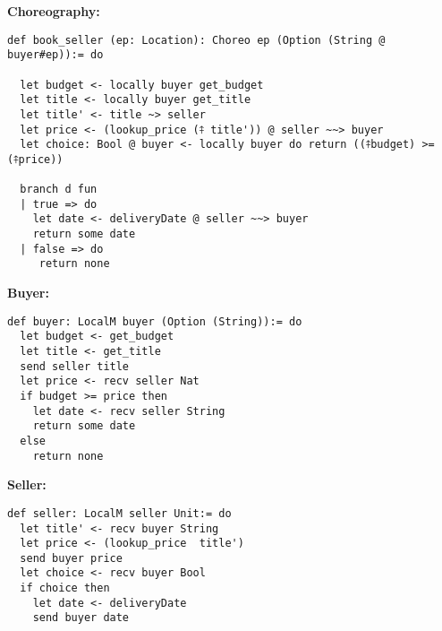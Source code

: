 \textbf{Choreography:}
\begin{lstlisting}[label={lst:buyer-seller-chor},language=lean]
def book_seller (ep: Location): Choreo ep (Option (String @ buyer#ep)):= do

  let budget <- locally buyer get_budget
  let title <- locally buyer get_title
  let title' <- title ~> seller
  let price <- (lookup_price (⤉ title')) @ seller ~~> buyer
  let choice: Bool @ buyer <- locally buyer do return ((⤉budget) >= (⤉price))

  branch d fun
  | true => do
    let date <- deliveryDate @ seller ~~> buyer
    return some date
  | false => do
     return none
\end{lstlisting}
\noindent
\begin{minipage}{.5\textwidth}
\textbf{Buyer:}

\begin{lstlisting}[label={lst:buyer-ep}, language=lean, basicstyle=\small]
def buyer: LocalM buyer (Option (String)):= do
  let budget <- get_budget
  let title <- get_title
  send seller title
  let price <- recv seller Nat
  if budget >= price then
    let date <- recv seller String
    return some date
  else
    return none
\end{lstlisting}
\end{minipage}
\begin{minipage}{.5\textwidth}
\textbf{Seller:}
\begin{lstlisting}[label={lst:seller-ep},language=lean, basicstyle=\small]
def seller: LocalM seller Unit:= do
  let title' <- recv buyer String
  let price <- (lookup_price  title')
  send buyer price
  let choice <- recv buyer Bool
  if choice then
    let date <- deliveryDate
    send buyer date
\end{lstlisting}
\end{minipage}
